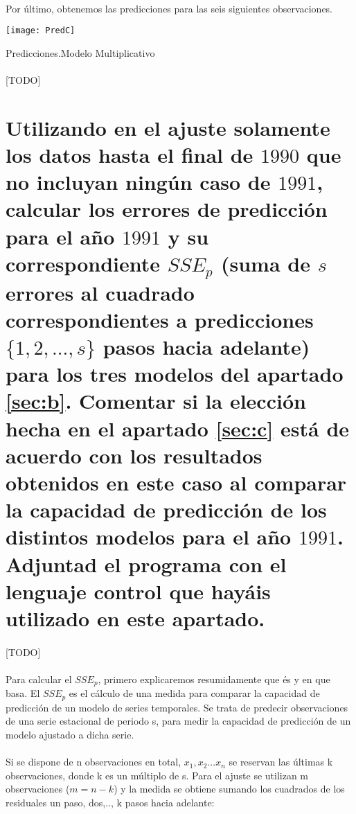\documentclass[a4paper, spanish]{article}
\begin{document}
    \paragraph{}
    Por último, obtenemos las predicciones para las seis siguientes observaciones.

    \begin{table}[htb!]
      \centering
      \texttt{[image: PredC]}
      \caption{Predicciones.Modelo Multiplicativo}
      \label{}
    \end{table}

    \paragraph{}
    [TODO]

  \section{Utilizando en el ajuste solamente los datos hasta el final de $1990$ que no incluyan ningún caso de $1991$, calcular los errores de predicción para el año $1991$ y su correspondiente $SSE_p$ (suma de $s$ errores al cuadrado correspondientes a predicciones $\{1, 2, ..., s\}$ pasos hacia adelante) para los tres modelos del apartado \ref{sec:b}. Comentar si la elección hecha en el apartado \ref{sec:c} está de acuerdo con los resultados obtenidos en este caso al comparar la capacidad de predicción de los distintos modelos para el año $1991$. Adjuntad el programa con el lenguaje control que hayáis utilizado en este apartado.}
  \label{sec:d}

    \paragraph{}
    [TODO]

    \paragraph{}
    Para calcular el $SSE_p$, primero explicaremos resumidamente que és y en que basa. El $SSE_p$ es el cálculo de una medida para comparar la capacidad de predicción de un modelo de series temporales.
    Se trata de predecir observaciones de una serie estacional de periodo s, para
    medir la capacidad de predicción de un modelo ajustado a dicha serie.

    \paragraph{}
    Si se dispone de n observaciones en total, $x_1,x_2...x_n$ se reservan las últimas k observaciones, donde k es un múltiplo de s. Para el ajuste se utilizan m observaciones ($m = n - k$) y la medida se obtiene sumando los cuadrados de los
    residuales un paso, dos,.., k pasos hacia adelante:
\end{document}
